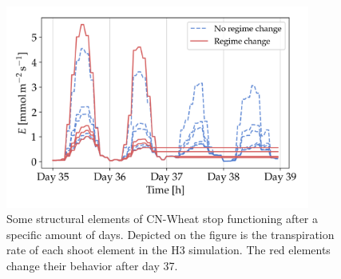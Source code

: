 
\begin{figure}[]
	\centering
    \includegraphics[width=10cm]{img/cn_regime_change.png}
	\caption[Some structural elements of CN-Wheat stop functioning after a specific amount of days.]{Some structural elements of CN-Wheat stop functioning after a specific amount of days. Depicted on the figure is the transpiration rate of each shoot element in the H3 simulation. The red elements change their behavior after day 37.}
	\label{fig:cnwheat-regime-change}
\end{figure}


